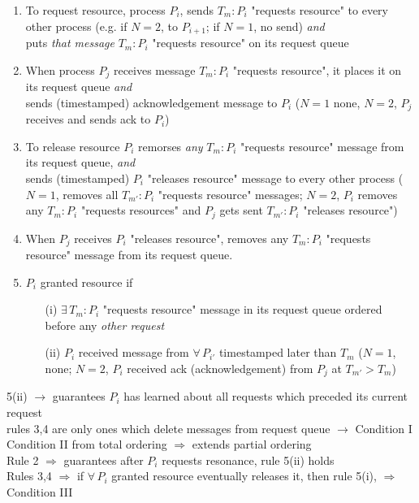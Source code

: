 \documentclass[10pt]{amsart}
\begin{document}
\begin{multicols*}{2}
\begin{enumerate}
	\item To request resource, process $P_i$, sends $T_m:P_i$ "requests resource" to every other process (e.g. if $N=2$, to $P_{i+1}$; if $N=1$, no send) \emph{and} \\
	puts \emph{that message} $T_m:P_i$ "requests resource" on its request queue
	\item When process $P_j$ receives message $T_m:P_i$ "requests resource", it places it on its request queue \emph{and} \\
	sends (timestamped) acknowledgement message to $P_i$ ($N=1$ none, $N=2$, $P_j$ receives and sends ack to $P_i$)
	\item To release resource $P_i$ remorses \emph{any} $T_m: P_i$ "requests resource" message from its request queue, \emph{and} \\
	sends (timestamped) $P_i$ "releases resource" message to every other process ($N=1$, removes all $T_{m'}:P_i$ "requests resource" messages; $N=2$, $P_i$ removes any $T_m:P_i$ "requests resources" and $P_j$ gets sent $T_{m'}:P_i$ "releases resource")
	\item When $P_j$ receives $P_i$ "releases resource", removes any $T_m:P_i$ "requests resource" message from its request queue.
	\item $P_i$ granted resource if 
	\begin{enumerate}
		\item[(i)] $\exists \, T_m: P_i$ "requests resource" message in its request queue ordered before any \emph{other request}
		\item[(ii)] $P_i$ received message from $\forall \, P_{i'}$ timestamped later than $T_m$ ($N=1$, none; $N=2$, $P_i$ received ack (acknowledgement) from $P_j$ at $T_{m'} > T_m$)
	\end{enumerate}
\end{enumerate}

5(ii) $\to$ guarantees $P_i$ has learned about all requests which preceded its current request \\
rules 3,4 are only ones which delete messages from request queue $\to$ Condition I \\
Condition II from total ordering $\Longrightarrow $ extends partial ordering \\
Rule 2 $\Longrightarrow$ guarantees after $P_i$ requests resonance, rule 5(ii) holds \\
Rules 3,4 $\Longrightarrow$ if $\forall \, P_i$ granted resource eventually releases it, then rule 5(i), $\Longrightarrow$ Condition III \\


\end{multicols*}
\end{document}
